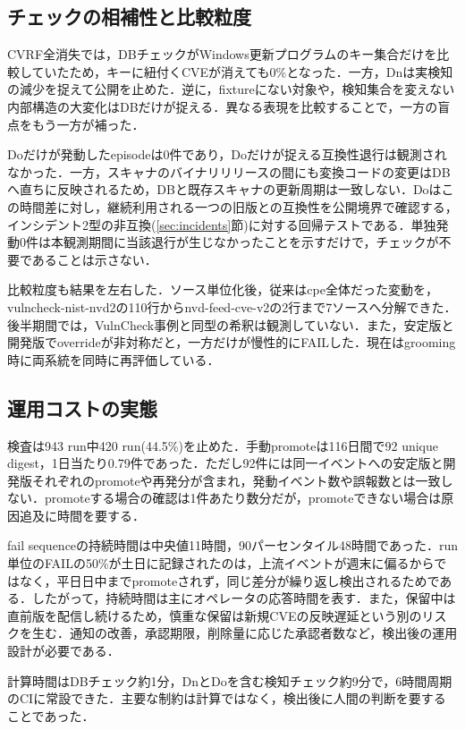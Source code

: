 \documentclass{css}
\begin{document}
\subsection{チェックの相補性と比較粒度}
\label{sec:blindspots}

CVRF全消失では，DBチェックがWindows更新プログラムのキー集合だけを比較していたため，キーに紐付くCVEが消えても0\%となった．一方，Dnは実検知の減少を捉えて公開を止めた．逆に，fixtureにない対象や，検知集合を変えない内部構造の大変化はDBだけが捉える．異なる表現を比較することで，一方の盲点をもう一方が補った．

Doだけが発動したepisodeは0件であり，Doだけが捉える互換性退行は観測されなかった．一方，スキャナのバイナリリリースの間にも変換コードの変更はDBへ直ちに反映されるため，DBと既存スキャナの更新周期は一致しない．Doはこの時間差に対し，継続利用される一つの旧版との互換性を公開境界で確認する，インシデント2型の非互換(\ref{sec:incidents}節)に対する回帰テストである．単独発動0件は本観測期間に当該退行が生じなかったことを示すだけで，チェックが不要であることは示さない．

比較粒度も結果を左右した．ソース単位化後，従来はcpe全体だった変動を，vulncheck-nist-nvd2の110行からnvd-feed-cve-v2の2行まで7ソースへ分解できた．後半期間では，VulnCheck事例と同型の希釈は観測していない．また，安定版と開発版でoverrideが非対称だと，一方だけが慢性的にFAILした．現在はgrooming時に両系統を同時に再評価している．

\subsection{運用コストの実態}
\label{sec:opscost}

検査は943 run中420 run(44.5\%)を止めた．手動promoteは116日間で92 unique digest，1日当たり0.79件であった．ただし92件には同一イベントへの安定版と開発版それぞれのpromoteや再発分が含まれ，発動イベント数や誤報数とは一致しない．promoteする場合の確認は1件あたり数分だが，promoteできない場合は原因追及に時間を要する．

fail sequenceの持続時間は中央値11時間，90パーセンタイル48時間であった．run単位のFAILの50\%が土日に記録されたのは，上流イベントが週末に偏るからではなく，平日日中までpromoteされず，同じ差分が繰り返し検出されるためである．したがって，持続時間は主にオペレータの応答時間を表す．また，保留中は直前版を配信し続けるため，慎重な保留は新規CVEの反映遅延という別のリスクを生む．通知の改善，承認期限，削除量に応じた承認者数など，検出後の運用設計が必要である．

計算時間はDBチェック約1分，DnとDoを含む検知チェック約9分で，6時間周期のCIに常設できた．主要な制約は計算ではなく，検出後に人間の判断を要することであった．
\end{document}
